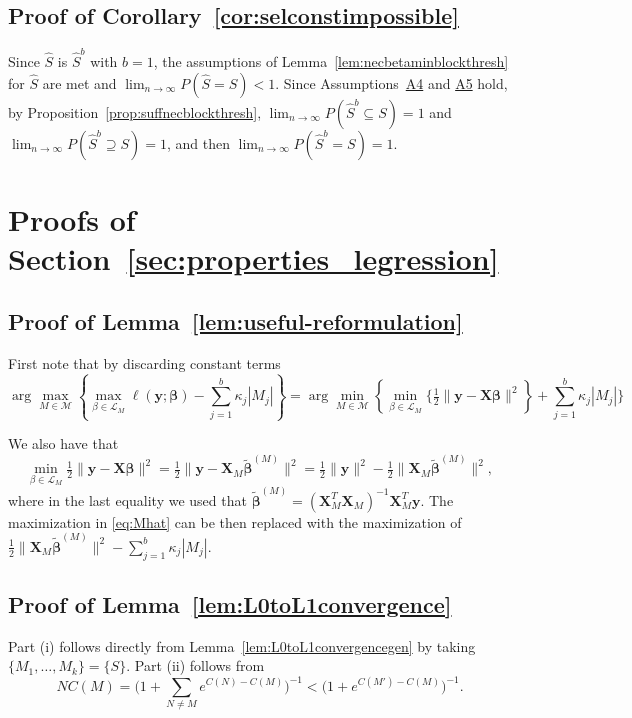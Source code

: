 \documentclass[bj,authoryear]{imsart}
\theoremstyle{plain}
\newcommand{\M}{\mathcal{M}}
\newcommand{\bs}{\boldsymbol}
\begin{document}
\subsection{Proof of Corollary~\ref{cor:selconstimpossible}}
Since $\hat{S}$ is $\hat{S}^b$ with $b=1$, the assumptions of Lemma~\ref{lem:necbetaminblockthresh} for $\hat{S}$ are met and $\lim_{n \to \infty} P(\hat{S} = S) < 1$. Since Assumptions~\hyperlink{lab:A4}{A4} and \hyperlink{lab:A5}{A5} hold, by Proposition~\ref{prop:suffnecblockthresh}, $\lim_{n \to \infty} P(\hat{S}^b \subseteq S)= 1$ and $\lim_{n \to \infty} P(\hat{S}^b \supseteq S)= 1$, and then $\lim_{n \to \infty} P(\hat{S}^b = S)= 1$.\color{black}

\section{Proofs of Section~\ref{sec:properties_legression}}\label{suppsec:proofseclinreg}
\subsection{Proof of Lemma~\ref{lem:useful-reformulation}}
	First note that by discarding constant terms 
 $$\arg\max_{M\in \M} \left\{\max_{\beta\in \mathcal{L}_M}\ell(\bs y; \bs \beta)-\sum_{j=1}^b\kappa_j |M_j| \right\}=\arg\min_{M\in \M} \left\{\min_{\beta\in \mathcal{L}_M}\bigg\{ \tfrac{1}{2}\|\bs y-\bs X\bs\beta\|^2\right\}+\sum_{j=1}^b\kappa_j |M_j| \bigg\}$$
 
 We also have that 
 $$\min_{\beta\in \mathcal{L}_M} \tfrac{1}{2}\|\bs y-\bs X\bs\beta\|^2=\tfrac{1}{2}\|\bs y-\bs X_{\!\!M}\tilde{\bs \beta}^{(M)}\|^2=\tfrac{1}{2}\|\bs y\|^2-\tfrac{1}{2}\|\bs X_{\!\!M}\tilde{\bs\beta}^{(M)}\|^2,$$
where in the last equality we used that $\tilde{\bs \beta}^{(M)}= (\bs X_M^T \bs X_M)^{-1} \bs X_M^T \bs y$.
 The maximization in \eqref{eq:Mhat} can be then replaced with the maximization of $\tfrac{1}{2}
 \|\bs X_{\!\!M}\tilde{\bs\beta}^{(M)}\|^2-\sum_{j=1}^b \kappa_j|M_j|$.

\subsection{Proof of Lemma~\ref{lem:L0toL1convergence}}
Part (i) follows directly from Lemma~\ref{lem:L0toL1convergencegen} by taking $\{M_1,\ldots,M_k\}=\{S\}$.
Part (ii) follows from
$$NC(M)=\Big(1+\sum_{N \neq M} e^{C(N)-C(M)}\Big)^{-1}
< \big(1+ e^{C(M')-C(M)}\big)^{-1}.$$ 
\end{document}

